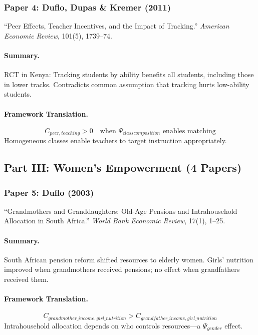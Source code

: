 \documentclass[12pt,a4paper]{article}
\begin{document}
\subsubsection{Paper 4: Duflo, Dupas \& Kremer (2011)}

``Peer Effects, Teacher Incentives, and the Impact of Tracking.''
\textit{American Economic Review}, 101(5), 1739--74.

\paragraph{Summary.}
RCT in Kenya: Tracking students by ability benefits all students, including those
in lower tracks. Contradicts common assumption that tracking hurts low-ability students.

\paragraph{Framework Translation.}
\begin{equation}
  C_{peer, teaching} > 0 \quad \text{when } \Psi_{class composition} \text{ enables matching}
\end{equation}
Homogeneous classes enable teachers to target instruction appropriately.

\subsection{Part III: Women's Empowerment (4 Papers)}

\subsubsection{Paper 5: Duflo (2003)}

``Grandmothers and Granddaughters: Old-Age Pensions and Intrahousehold Allocation in South Africa.''
\textit{World Bank Economic Review}, 17(1), 1--25.

\paragraph{Summary.}
South African pension reform shifted resources to elderly women. Girls' nutrition
improved when grandmothers received pensions; no effect when grandfathers received them.

\paragraph{Framework Translation.}
\begin{equation}
  C_{grandmother\_income, girl\_nutrition} > C_{grandfather\_income, girl\_nutrition}
\end{equation}
Intrahousehold allocation depends on who controls resources---a $\Psi_{gender}$ effect.
\end{document}

